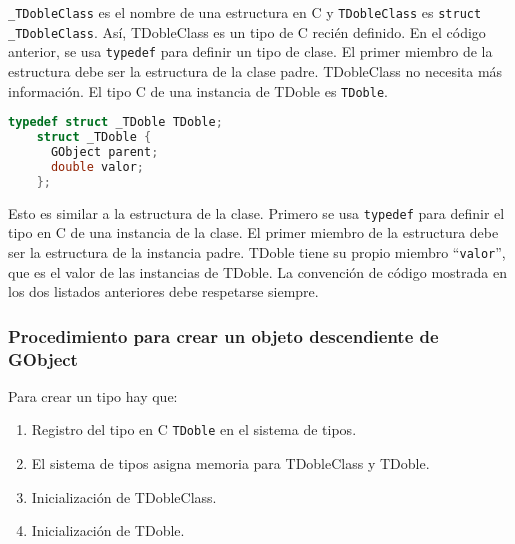   \texttt{\_TDobleClass} es el nombre de una estructura en C y \texttt{TDobleClass} es \texttt{struct \_TDobleClass}.
  Así, \textsf{TDobleClass} es un tipo de C recién definido.
  En el código anterior, se usa \texttt{typedef} para definir un tipo de clase. El primer miembro de la estructura
  debe ser la estructura de la clase padre. \textsf{TDobleClass} no necesita más información. El tipo C de una
  instancia de \textsf{TDoble} es \texttt{TDoble}.
  \begin{lstlisting}[language=C]
    typedef struct _TDoble TDoble;
    struct _TDoble {
      GObject parent;
      double valor;
    };
  \end{lstlisting}
  
  Esto es similar a la estructura de la clase. Primero se usa \texttt{typedef} para definir el tipo en C de una
  instancia de la clase. El primer miembro de la estructura debe ser la estructura de la instancia padre.
  \textsf{TDoble} tiene su propio miembro ``\texttt{valor}'', que es el valor de las instancias de \textsf{TDoble}.
  La convención de código mostrada en los dos listados anteriores debe respetarse siempre.

  \subsubsection{Procedimiento para crear un objeto descendiente de \textsf{GObject}}
  Para crear un tipo  hay que:
  \begin{enumerate}
    \tightlist
  \item Registro del tipo en C \texttt{TDoble} en el sistema de tipos.
  \item El sistema de tipos asigna memoria para \textsf{TDobleClass} y \textsf{TDoble}.
  \item Inicialización de \textsf{TDobleClass}.
  \item Inicialización de \textsf{TDoble}.
  \end{enumerate}

